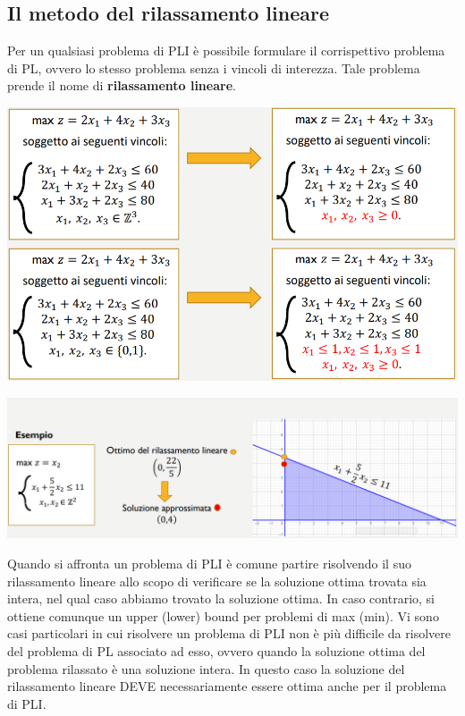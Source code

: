 \documentclass[12pt]{article}
\begin{document}
\subsection{Il metodo del rilassamento lineare}
Per un qualsiasi problema di PLI è possibile formulare il corrispettivo problema di PL, ovvero lo stesso problema senza i vincoli di interezza.
Tale problema prende il nome di \textbf{rilassamento lineare}.
\begin{center}
    \includegraphics[width = 1\linewidth]{Images/61.png}
\end{center}
\begin{center}
    \includegraphics[width = 1\linewidth]{Images/62.png}
\end{center}
Quando si affronta un problema di PLI è comune partire risolvendo il suo rilassamento lineare allo scopo di verificare se la soluzione
ottima trovata sia intera, nel qual caso abbiamo trovato la soluzione ottima. In caso contrario, si ottiene comunque un upper (lower) bound per problemi di max (min).
Vi sono casi particolari in cui risolvere un problema di PLI non è più difficile da risolvere del problema di PL associato ad esso, ovvero
quando la soluzione ottima del problema rilassato è una soluzione intera. In questo caso la soluzione del rilassamento lineare
DEVE necessariamente essere ottima anche per il problema di PLI. \newline
\end{document}
